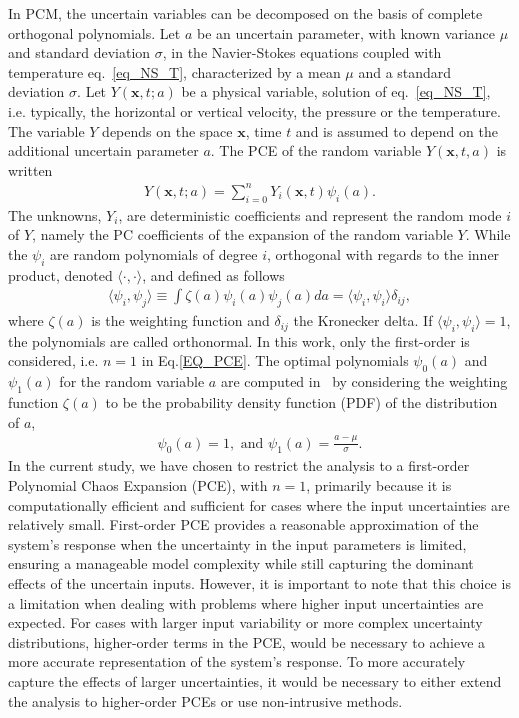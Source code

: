 In PCM, the uncertain variables can be decomposed on the basis of complete orthogonal polynomials. 
Let $a$ be an uncertain parameter, with known variance $\mu$ and standard deviation $\sigma$, in the Navier-Stokes equations coupled with temperature eq.~\eqref{eq_NS_T}, characterized by a mean $\mu$ and a standard deviation  $\sigma$. %
Let $Y(\textbf{x},t;a)$ be a physical variable, solution of eq.~\eqref{eq_NS_T}, i.e. typically, the horizontal or vertical velocity, the pressure or the temperature. The variable $Y$ depends on the space $\textbf{x}$, time $t$ and is assumed to depend on the additional uncertain parameter $a$.
The PCE of the random variable $Y(\mathbf{x},t,a)$ is written
\begin{align}
Y(\mathbf{x},t;a)= \sum_{i=0}^{n} Y_i(\mathbf{x},t) \psi_i(a).
\label{EQ_PCE}
\end{align}
The unknowns, $Y_i$, 
are deterministic coefficients and represent the random mode $i$ of $Y$, namely the PC coefficients of the expansion of the random variable $Y$. While the $\psi_i$ are random
polynomials of degree $i$, orthogonal with regards to the inner product, denoted $\langle \cdot,\cdot\rangle$, and defined as follows
\begin{align}
\langle \psi_i, \psi_j\rangle \equiv \int \zeta(a)\psi_i(a) \psi_j(a) da= \langle \psi_i,\psi_i\rangle \delta_{ij},
\label{orthogonal}
\end{align}
where $\zeta(a)$ is the weighting function and $\delta_{ij}$ the Kronecker delta. If $\langle \psi_i,\psi_i \rangle =1$, the polynomials are called orthonormal. In this work, only the first-order is considered, i.e.  $n=1$ in Eq.\eqref{EQ_PCE}.  The optimal polynomials $\psi_0(a)$ and $\psi_1(a)$ for the random variable $a$ are computed in~\cite{nouaime2025sensitivity} by considering the weighting function $\zeta(a)$ to be the probability density function (PDF) of the distribution of $a$, 
\begin{align}
    \psi_0(a)=1, \text{ and } \psi_1(a)= \frac{a-\mu}{\sigma}.
\end{align}
In the current study, we have chosen to restrict the analysis to a first-order Polynomial Chaos Expansion (PCE), with $n = 1$, primarily because it is computationally efficient and sufficient for cases where the input uncertainties are relatively small. First-order PCE provides a reasonable approximation of the system’s response when the uncertainty in the input parameters is limited, ensuring a manageable model complexity while still capturing the dominant effects of the uncertain inputs.
However, it is important to note that this choice is a limitation when dealing with problems where higher input uncertainties are expected. For cases with larger input variability or more complex uncertainty distributions, higher-order terms in the PCE, would be necessary to achieve a more accurate representation of the system's response. To more accurately capture the effects of larger uncertainties, it would be necessary to either extend the analysis to higher-order PCEs or use non-intrusive methods.


